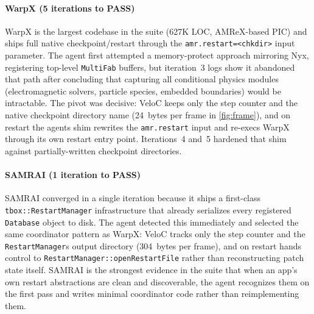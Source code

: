 \documentclass[conference]{IEEEtran}
\begin{document}
\paragraph{WarpX (5 iterations to PASS)}
WarpX is the largest codebase in the suite (627K LOC, AMReX-based PIC) and ships full native checkpoint/restart through the \texttt{amr.restart=<chkdir>} input parameter. The agent first attempted a memory-protect approach mirroring Nyx, registering top-level \texttt{MultiFab} buffers, but iteration~3 logs show it abandoned that path after concluding that capturing all conditional physics modules (electromagnetic solvers, particle species, embedded boundaries) would be intractable. The pivot was decisive: VeloC keeps only the step counter and the native checkpoint directory name (24~bytes per frame in \autoref{fig:frame}), and on restart the agent\textquotesingle s shim rewrites the \texttt{amr.restart} input and re-execs WarpX through its own restart entry point. Iterations~4 and~5 hardened that shim against partially-written checkpoint directories.

\paragraph{SAMRAI (1 iteration to PASS)}
SAMRAI converged in a single iteration because it ships a first-class \texttt{tbox::RestartManager} infrastructure that already serializes every registered \texttt{Database} object to disk. The agent detected this immediately and selected the same coordinator pattern as WarpX: VeloC tracks only the step counter and the \texttt{RestartManager}\textquotesingle s output directory (304~bytes per frame), and on restart hands control to \texttt{RestartManager::openRestartFile} rather than reconstructing patch state itself. SAMRAI is the strongest evidence in the suite that when an app's own restart abstractions are clean and discoverable, the agent recognizes them on the first pass and writes minimal coordinator code rather than reimplementing them.
\end{document}
